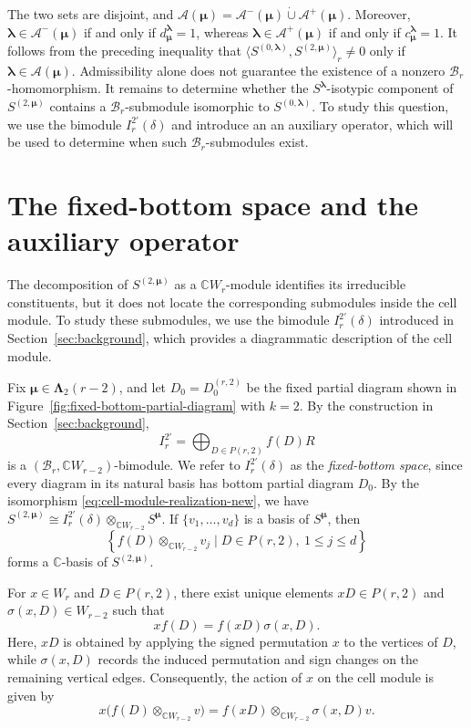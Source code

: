 \documentclass[10pt,a4paper]{amsart}
\newcommand{\C}{\mathbb{C}}
\newcommand{\1}{\mathfrak{1}}
\newcommand{\B}{\mathcal{B}}
\begin{document}
The two sets are disjoint, and $\mathcal A(\bm\mu)=\mathcal A^-(\bm\mu)\mathbin{\dot\cup}\mathcal A^+(\bm\mu)
$. Moreover, $\bm\lambda\in\mathcal A^-(\bm\mu)$ if and only if $d_{\bm\mu}^{\bm\lambda}=1$, whereas $\bm\lambda\in\mathcal A^+(\bm\mu)$ if and only if $c_{\bm\mu}^{\bm\lambda}=1$. It follows from the preceding inequality that $\langle S^{(0,\bm\lambda)},S^{(2,\bm\mu)}\rangle_r\neq0$ only if
$\bm\lambda\in\mathcal A(\bm\mu)$. Admissibility alone does not guarantee the existence of a nonzero $\B_r$-homomorphism. It remains to determine whether the $S^{\bm\lambda}$-isotypic component of $S^{(2,\bm\mu)}$ contains a $\B_r$-submodule isomorphic
to $S^{(0,\bm\lambda)}$. To study this question, we use the bimodule $I_r^{2'}(\delta)$ and introduce an an auxiliary operator, which will be used to determine when such $\B_r$-submodules exist.

\section{The fixed-bottom space and the auxiliary operator}
\label{sec:fixed-bottom-operator}
The decomposition of $S^{(2,\bm\mu)}$ as a $\C W_r$-module identifies its irreducible constituents, but it does not locate the corresponding submodules inside the cell module. To study these submodules, we use the bimodule $I_r^{2'}(\delta)$ introduced in Section~\ref{sec:background}, which provides a diagrammatic description of the cell module.

Fix $\bm\mu\in\bm\Lambda_2(r-2)$, and let
$D_0=D_0^{(r,2)}$ be the fixed partial diagram shown in
Figure~\ref{fig:fixed-bottom-partial-diagram} with $k=2$. By the construction in Section~\ref{sec:background},
$$
I_r^{2'}=\bigoplus_{D\in P(r,2)}f(D)R
$$
is a $(\B_r,\C W_{r-2})$-bimodule.
We refer to $I_r^{2'}(\delta)$ as the \emph{fixed-bottom space},
since every diagram in its natural basis has bottom partial
diagram $D_0$. By the isomorphism
\eqref{eq:cell-module-realization-new}, we have
$S^{(2,\bm\mu)}
\cong I_r^{2'}(\delta)\otimes_{\C W_{r-2}}S^{\bm\mu}$.
If $\{v_1,\ldots,v_d\}$ is a basis of $S^{\bm\mu}$, then
$$
\left\{
f(D)\otimes_{\C W_{r-2}}v_j
\mid D\in P(r,2),\ 1\leq j\leq d
\right\}
$$
forms a $\C$-basis of $S^{(2,\bm\mu)}$.

For $x\in W_r$ and $D\in P(r,2)$, there exist unique elements
$xD\in P(r,2)$ and $\sigma(x,D)\in W_{r-2}$ such that
$$
xf(D)=f(xD)\sigma(x,D).
$$
Here, $xD$ is obtained by applying the signed permutation $x$
to the vertices of $D$, while $\sigma(x,D)$ records the
induced permutation and sign changes on the remaining
vertical edges. Consequently, the action of $x$ on the
cell module is given by
$$
x\bigl(f(D)\otimes_{\C W_{r-2}}v\bigr)
=f(xD)\otimes_{\C W_{r-2}}\sigma(x,D)v.
$$
\end{document}
